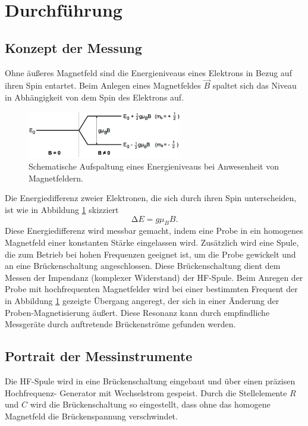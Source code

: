 \section{Durchführung}
\label{sec:Durchführung}
\subsection{Konzept der Messung}
\label{sec:Durchführung1}

Ohne äußeres Magnetfeld sind die Energieniveaus eines Elektrons in Bezug auf
ihren Spin entartet.
Beim Anlegen eines Magnetfeldes $\vec{B}$ spaltet sich das Niveau in Abhängigkeit
von dem Spin des Elektrons auf.
\begin{figure}
  \centering
  \includegraphics[width=0.6\textwidth]{graphics/energieaufspaltung.png}
  \caption{Schematische Aufspaltung eines Energieniveaus bei Anwesenheit von Magnetfeldern.\cite{skript}}
  \label{fig:energieaufspaltung}
\end{figure}
Die Energiedifferenz zweier Elektronen, die sich durch ihren Spin unterscheiden,
ist wie in Abbildung \ref{fig:energieaufspaltung} skizziert
\begin{equation}
  \mathup\Delta E = g\mu_B B.
	\label{eqn:B}
\end{equation}
Diese Energiedifferenz wird messbar gemacht, indem eine Probe in ein homogenes
Magnetfeld einer konstanten Stärke eingelassen wird. Zusätzlich wird eine Spule,
die zum Betrieb bei hohen Frequenzen geeignet ist, um die Probe gewickelt und an
eine Brückenschaltung angeschlossen. Diese Brückenschaltung dient dem Messen der
Impendanz (komplexer Widerstand) der HF-Spule. Beim Anregen der Probe mit
hochfrequenten Magnetfelder wird bei einer bestimmten Frequent der in Abbildung
\ref{fig:energieaufspaltung} gezeigte Übergang angeregt, der sich in einer Änderung
der Proben-Magnetisierung äußert.
Diese Resonanz kann durch empfindliche Messgeräte durch auftretende Brückenströme
gefunden werden.

\subsection{Portrait der Messinstrumente}
Die HF-Spule wird in eine Brückenschaltung eingebaut und über einen präzisen Hochfrequenz-
Generator mit Wechselstrom gespeist. Durch die Stellelemente $R$ und $C$ wird die
Brückenschaltung so eingestellt, dass ohne das homogene Magnetfeld die Brückenspannung
verschwindet.

